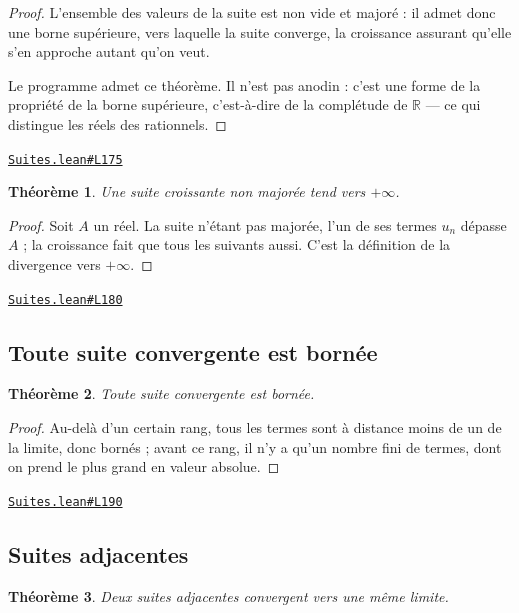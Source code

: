 \documentclass[11pt,a4paper]{article}
\theoremstyle{definition}
\theoremstyle{plain}
\newtheorem{theoreme}{Théorème}
\newcommand{\source}[2]{\par\smallskip\noindent\hfill{\footnotesize\href{#1}{\texttt{#2}}}\par\smallskip}
\begin{document}
\begin{proof}
L'ensemble des valeurs de la suite est non vide et majoré : il admet donc une borne
supérieure, vers laquelle la suite converge, la croissance assurant qu'elle s'en approche
autant qu'on veut.

Le programme admet ce théorème. Il n'est pas anodin : c'est une forme de la propriété de
la borne supérieure, c'est-à-dire de la complétude de $\mathbb{R}$ — ce qui distingue les
réels des rationnels.
\end{proof}
\source{https://github.com/Commutator-IO/learn-lean/blob/main/courses/02-lycee/03-suites/Suites.lean\#L175}{Suites.lean\#L175}

\begin{theoreme}
Une suite croissante non majorée tend vers $+\infty$.
\end{theoreme}

\begin{proof}
Soit $A$ un réel. La suite n'étant pas majorée, l'un de ses termes $u_n$ dépasse $A$ ;
la croissance fait que tous les suivants aussi. C'est la définition de la divergence vers
$+\infty$.
\end{proof}
\source{https://github.com/Commutator-IO/learn-lean/blob/main/courses/02-lycee/03-suites/Suites.lean\#L180}{Suites.lean\#L180}

\subsection{Toute suite convergente est bornée}

\begin{theoreme}
Toute suite convergente est bornée.
\end{theoreme}

\begin{proof}
Au-delà d'un certain rang, tous les termes sont à distance moins de un de la limite,
donc bornés ; avant ce rang, il n'y a qu'un nombre fini de termes, dont on prend le plus
grand en valeur absolue.
\end{proof}
\source{https://github.com/Commutator-IO/learn-lean/blob/main/courses/02-lycee/03-suites/Suites.lean\#L190}{Suites.lean\#L190}

\subsection{Suites adjacentes}

\begin{theoreme}
Deux suites adjacentes convergent vers une même limite.
\end{theoreme}
\end{document}
